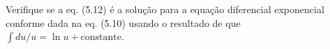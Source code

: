 Verifique se a eq. (5.12) é a solução para a equação diferencial exponencial conforme dada na eq. (5.10) usando o resultado de que $\int du/u = \ln u + \text{constante}$.

